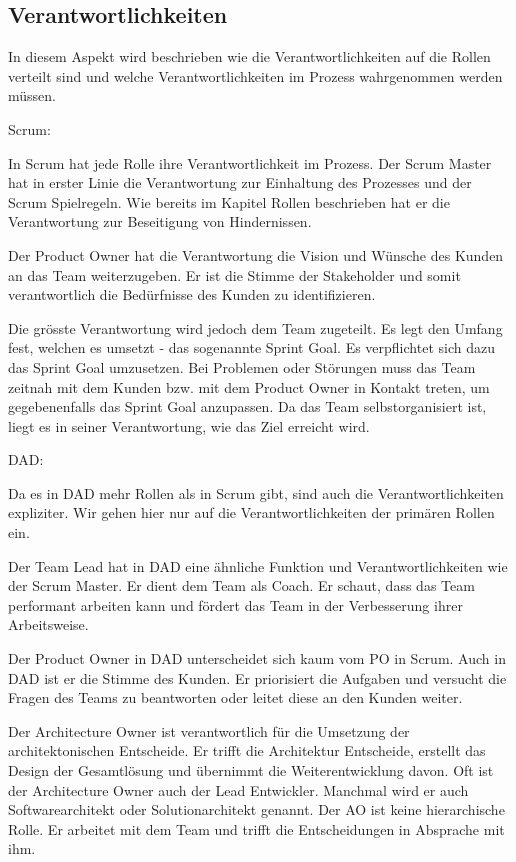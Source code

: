 \subsection{Verantwortlichkeiten}

In diesem Aspekt wird beschrieben wie die Verantwortlichkeiten auf die Rollen verteilt sind und welche Verantwortlichkeiten im Prozess wahrgenommen werden müssen.

{\Large Scrum:}\cite{scrumResponsibilites} \medskip

In Scrum hat jede Rolle ihre Verantwortlichkeit im Prozess. Der Scrum Master hat in erster Linie die Verantwortung zur Einhaltung des Prozesses und der Scrum Spielregeln. Wie bereits im Kapitel Rollen beschrieben hat er die Verantwortung zur Beseitigung von Hindernissen.

Der Product Owner hat die Verantwortung die Vision und Wünsche des Kunden an das Team weiterzugeben. Er ist die Stimme der Stakeholder und somit verantwortlich die Bedürfnisse des Kunden zu identifizieren.

Die grösste Verantwortung wird jedoch dem Team zugeteilt. Es legt den Umfang fest, welchen es umsetzt - das sogenannte Sprint Goal. Es verpflichtet sich dazu das Sprint Goal umzusetzen. Bei Problemen oder Störungen muss das Team zeitnah mit dem Kunden bzw. mit dem Product Owner in Kontakt treten, um gegebenenfalls das Sprint Goal anzupassen. Da das Team selbstorganisiert ist, liegt es in seiner Verantwortung, wie das Ziel erreicht wird.

\smallskip
{\Large DAD:}\cite{dadResponsibilites} \medskip

Da es in DAD mehr Rollen als in Scrum gibt, sind auch die Verantwortlichkeiten expliziter.
Wir gehen hier nur auf die Verantwortlichkeiten der primären Rollen ein.

Der Team Lead hat in DAD eine ähnliche Funktion und Verantwortlichkeiten wie der Scrum Master. Er dient dem Team als Coach. Er schaut, dass das Team performant arbeiten kann und fördert das Team in der Verbesserung ihrer Arbeitsweise.

Der Product Owner in DAD unterscheidet sich kaum vom PO in Scrum. Auch in DAD ist er die Stimme des Kunden. Er priorisiert die Aufgaben und versucht die Fragen des Teams zu beantworten oder leitet diese an den Kunden weiter.

Der Architecture Owner ist verantwortlich für die Umsetzung der architektonischen Entscheide. Er trifft die Architektur Entscheide, erstellt das Design der Gesamtlösung und übernimmt die Weiterentwicklung davon. Oft ist der Architecture Owner auch der Lead Entwickler. Manchmal wird er auch Softwarearchitekt oder Solutionarchitekt genannt. Der AO ist keine hierarchische Rolle. Er arbeitet mit dem Team und trifft die Entscheidungen in Absprache mit ihm.

